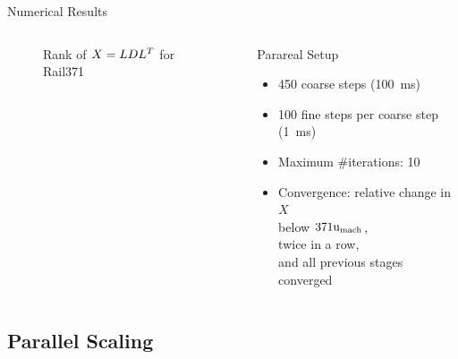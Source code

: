 \begin{frame}{Numerical Results}
\begin{columns}
\begin{minipage}[b][0.75\textwidth][c]{\textwidth}
{\begin{figure}
  \caption{Rank of $X=LDL^T$ for Rail371}
  \end{figure}
}
  \end{minipage}
  \begin{block}{Parareal Setup}
    \begin{itemize}
      \item
        450 coarse steps (\SI{100}{\milli\second})
      \item
        100 fine steps per coarse step (\SI{1}{\milli\second})
      \item
        Maximum \#iterations: 10
      \item
        Convergence:
        relative change in~$X$\\ below $371\mathrm u_\text{mach}$,\\
        twice in a row,\\
        and all previous stages converged
    \end{itemize}
  \end{block}
  \end{columns}
\end{frame}

\subsection{Parallel Scaling}

